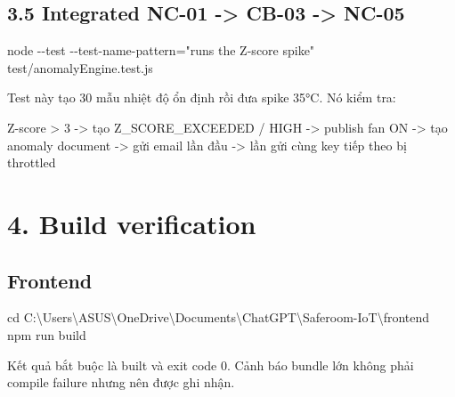 \documentclass[11pt,oneside,openany]{book}
\renewcommand{\texttt}[1]{{\ttfamily\small #1}}
\newenvironment{Shaded}{\begin{snugshade}}{\end{snugshade}}
\newcommand{\FunctionTok}[1]{\textcolor[rgb]{0.56,0.27,0.68}{#1}}
\newcommand{\NormalTok}[1]{\textcolor[rgb]{0.81,0.81,0.76}{#1}}
\newcommand{\OperatorTok}[1]{\textcolor[rgb]{0.81,0.81,0.76}{#1}}
\newcommand{\StringTok}[1]{\textcolor[rgb]{0.96,0.31,0.31}{#1}}
\renewenvironment{Shaded}{%
  \def\FrameCommand{\fboxsep=8pt\colorbox{shadecolor}}%
  \MakeFramed{\advance\hsize-\width\FrameRestore}%
}{\endMakeFramed}
\begin{document}
\subsection{3.5 Integrated NC-01 -\textgreater{} CB-03 -\textgreater{}
NC-05}\label{35-integrated-nc-01---cb-03---nc-05}

\begin{Shaded}
\begin{Highlighting}[]
\NormalTok{node }\OperatorTok{{-}{-}}\NormalTok{test }\OperatorTok{{-}{-}}\NormalTok{test{-}name{-}pattern}\OperatorTok{=}\StringTok{"runs the Z{-}score spike"}\NormalTok{ test}\OperatorTok{/}\NormalTok{anomalyEngine}\OperatorTok{.}\FunctionTok{test}\OperatorTok{.}\FunctionTok{js}
\end{Highlighting}
\end{Shaded}

Test này tạo 30 mẫu nhiệt độ ổn định rồi đưa spike 35°C. Nó kiểm tra:

\begin{Shaded}
\begin{Highlighting}[]
\NormalTok{Z{-}score \textgreater{} 3}
\NormalTok{{-}\textgreater{} tạo Z\_SCORE\_EXCEEDED / HIGH}
\NormalTok{{-}\textgreater{} publish fan ON}
\NormalTok{{-}\textgreater{} tạo anomaly document}
\NormalTok{{-}\textgreater{} gửi email lần đầu}
\NormalTok{{-}\textgreater{} lần gửi cùng key tiếp theo bị throttled}
\end{Highlighting}
\end{Shaded}

\section{4. Build verification}\label{4-build-verification}

\subsection{Frontend}\label{frontend}

\begin{Shaded}
\begin{Highlighting}[]
\FunctionTok{cd}\NormalTok{ C}\OperatorTok{:}\NormalTok{\textbackslash{}Users\textbackslash{}ASUS\textbackslash{}OneDrive\textbackslash{}Documents\textbackslash{}ChatGPT\textbackslash{}Saferoom{-}IoT\textbackslash{}frontend}
\NormalTok{npm run build}
\end{Highlighting}
\end{Shaded}

Kết quả bắt buộc là \texttt{built} và exit code 0. Cảnh báo bundle lớn
không phải compile failure nhưng nên được ghi nhận.
\end{document}

